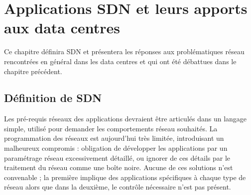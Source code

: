 
\chapter{Applications SDN et leurs apports aux data centres}

Ce chapitre définira SDN et présentera les réponses aux problématiques réseau rencontrées en général dans les data centres et qui ont été débattues dans le chapitre précédent. %

\section{Définition de SDN}

Les pré-requis réseaux des applications devraient être articulés dans un langage simple, utilisé pour demander les comportements réseau souhaités. La  programmation des réseaux est aujourd'hui très limitée, introduisant un malheureux compromis : obligation de développer les applications par un paramétrage réseau excessivement détaillé, ou ignorer de ces détails par le traitement du réseau comme une boîte noire.
Aucune de ces solutions n'est convenable ; la première implique des applications spécifiques à chaque type de réseau alors que dans la deuxième, le contrôle nécessaire %
n'est pas présent. 


